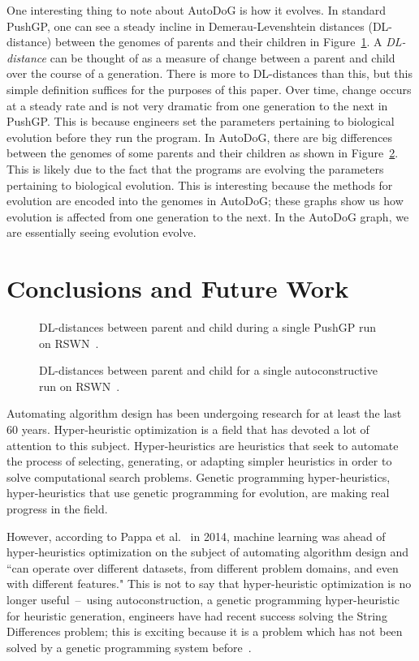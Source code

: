 \documentclass{sig-alternate}
\begin{document}
One interesting thing to note about AutoDoG is how it evolves. In standard PushGP, one can see a steady incline in Demerau-Levenshtein distances (DL-distance) between the genomes of parents and their children in Figure~\ref{fig:standard}. A \textit{DL-distance} can be thought of as a measure of change between a parent and child over the course of a generation. There is more to DL-distances than this, but this simple definition suffices for the purposes of this paper. Over time, change occurs at a steady rate and is not very dramatic from one generation to the next in PushGP. This is because engineers set the parameters pertaining to biological evolution before they run the program. In AutoDoG, there are big differences between the genomes of some parents and their children as shown in Figure~\ref{fig:ac}. This is likely due to the fact that the programs are evolving the parameters pertaining to biological evolution. This is interesting because the methods for evolution are encoded into the genomes in AutoDoG; these graphs show us how evolution is affected from one generation to the next. In the AutoDoG graph, we are essentially seeing evolution evolve.
\vspace{.3cm}
\section{Conclusions and Future Work}
\label{sec:conclusion}
\begin{figure}
	\caption{DL-distances between parent and child during a single PushGP run on RSWN~\cite{spector:2016}.}
	\label{fig:standard}
\end{figure}


\begin{figure}
	\caption{DL-distances between parent and child for a single autoconstructive run on RSWN~\cite{spector:2016}.}
	\label{fig:ac}
\end{figure}
Automating algorithm design has been undergoing research for at least the last 60 years. Hyper-heuristic optimization is a field that has devoted a lot of attention to this subject. Hyper-heuristics are heuristics that seek to automate the process of selecting, generating, or adapting simpler heuristics in order to solve computational search problems. Genetic programming hyper-heuristics, hyper-heuristics that use genetic programming for evolution, are making real pro\-gress in the field.

However, according to Pappa et al.~\cite{pappa:2014} in 2014, machine learning was ahead of hyper-heuristics optimization on the subject of automating algorithm design and ``can operate over different datasets, from different problem domains, and even with different features." This is not to say that hyper-heuristic optimization is no longer useful~--~using autoconstruction, a genetic programming hyper-heuristic for heuristic generation, engineers have had recent success solving the String Differences problem; this is exciting because it is a problem which has not been solved by a genetic programming system before~\cite{eva:2017}.
\end{document}
